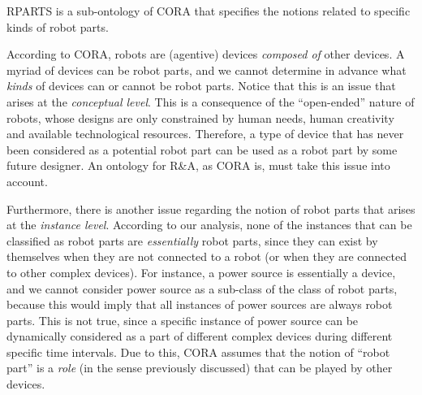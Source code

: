 \documentclass[preprint,12pt]{elsarticle}
\begin{document}


RPARTS is a sub-ontology of CORA that specifies the notions related to specific kinds of robot parts.

According to CORA, robots are (agentive) devices \emph{composed of} other devices. A myriad of devices can be robot parts, and we cannot determine in advance what \emph{kinds} of devices can or cannot be robot parts. Notice that this is an issue that arises at the \emph{conceptual level}. This is a consequence of the ``open-ended'' nature of robots, whose designs are only constrained by human needs, human creativity and available technological resources. Therefore, a type of device that has never been considered as a potential robot part can be used as a robot part by some future designer. An ontology for R\&A, as CORA is, must take this issue into account.

Furthermore, there is another issue regarding the notion of robot parts that arises at the \emph{instance level}. According to our analysis, none of the instances that can be classified as robot parts are \emph{essentially} robot parts, since they can exist by themselves when they are not connected to a robot (or when they are connected to other complex devices). For instance, a power source is essentially a device, and we cannot consider power source as a sub-class of the class of robot parts, because this would imply that all instances of power sources are always robot parts. This is not true, since a specific instance of power source can be dynamically considered as a part of different complex devices during different specific time intervals. Due to this, CORA assumes that the notion of ``robot part'' is a \emph{role} (in the sense previously discussed) that can be played by other devices.  %

\end{document}

